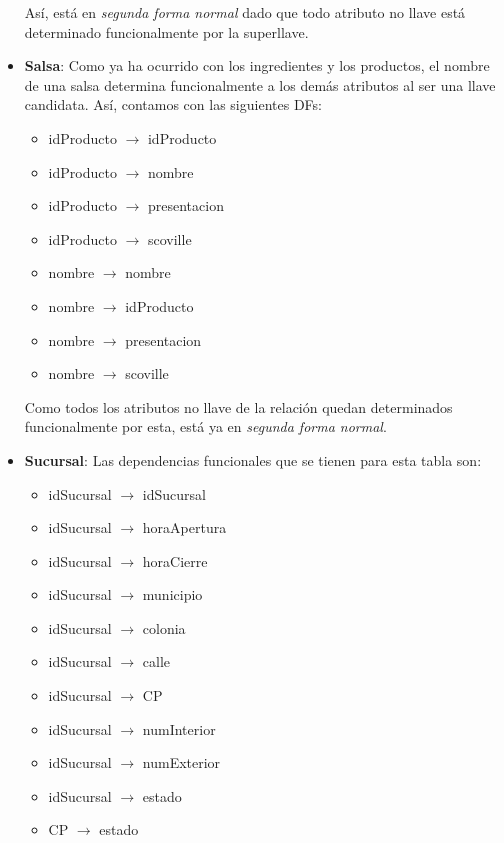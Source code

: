 \documentclass[11pt,letterpaper]{article}
\begin{document}
\begin{itemize}
\begin{itemize}
\end{itemize}

Así, está en \textit{segunda forma normal} dado que todo atributo no llave está determinado funcionalmente por la superllave.
\item \textbf{Salsa}: Como ya ha ocurrido con los ingredientes y los productos, el nombre de una salsa determina funcionalmente a los demás atributos al ser una llave candidata. Así, contamos con las siguientes DFs:

\begin{itemize}
\item idProducto $\rightarrow$ idProducto 

\item idProducto $\rightarrow$ nombre
\item idProducto $\rightarrow$ presentacion
\item idProducto $\rightarrow$ scoville


\item nombre $\rightarrow$ nombre 

\item nombre $\rightarrow$ idProducto
\item nombre $\rightarrow$ presentacion
\item nombre $\rightarrow$ scoville

\end{itemize}

Como todos los atributos no llave de la relación quedan determinados funcionalmente por esta, está ya en \textit{segunda forma normal}. 
\item \textbf{Sucursal}: Las dependencias funcionales que se tienen para esta tabla son:

\begin{itemize}
\item idSucursal $\rightarrow$ idSucursal

\item idSucursal $\rightarrow$ horaApertura
\item idSucursal $\rightarrow$ horaCierre
\item idSucursal $\rightarrow$ municipio
\item idSucursal $\rightarrow$ colonia
\item idSucursal $\rightarrow$ calle
\item idSucursal $\rightarrow$ CP
\item idSucursal $\rightarrow$ numInterior
\item idSucursal $\rightarrow$ numExterior
\item idSucursal $\rightarrow$ estado
\item CP $\rightarrow$ estado


\end{itemize}
\end{itemize}
\end{document}
